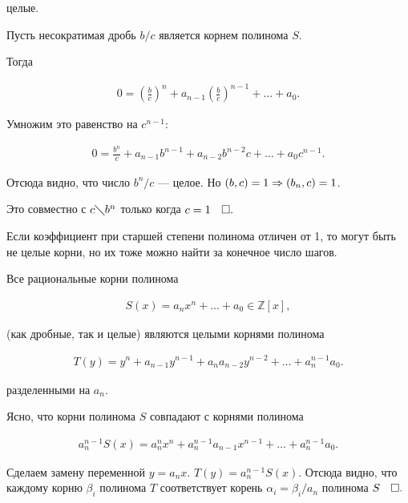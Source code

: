 \documentclass{article}
\begin{document}
целые.

\proof

Пусть несократимая дробь $b/c$ является корнем полинома $S$.

Тогда

\begin{align*}
	0=\left(\frac{b}{c}\right)^n+a_{n-1} \left(\frac{b}{c}\right)^{n-1}+\ldots +a_0.
\end{align*}

Умножим это равенство на $c^{n-1}$:

\begin{align*}
	0=\frac{b^n}{c}+a_{n-1} b^{n-1}+a_{n-2} b^{n-2} c+\ldots +a_0 c^{n-1}.
\end{align*}

Отсюда видно, что число $b^n/c$ --- целое. Но $(b, c) = 1 \Rarr (b_n, c) = 1$.

Это совместно с  $c\diagdown b^n$ только когда $c = 1~~\qed$ \newline

Если коэффициент при старшей степени полинома отличен от 1, то могут быть не целые корни, но их тоже можно найти за конечное число шагов. \newpage

\theorem[6.37.]

Все рациональные корни полинома

\begin{align*}
	S(x)=a_n x^n+\ldots +a_0\in\mathbb{Z} [x],
\end{align*}

(как дробные, так и целые) являются целыми корнями полинома

\begin{align*}
	T(y)=y^n+a_{n-1} y^{n-1}+a_n a_{n-2} y^{n-2}+\ldots +a^{n-1}_n a_0.
\end{align*}

разделенными на $a_n$.

\proof

Ясно, что корни полинома $S$ совпадают с корнями полинома

\begin{align*}
	a^{n-1}_n S(x)=a^n_n x^n+a^{n-1}_n a_{n-1} x^{n-1}+\ldots +a^{n-1}_n a_0.
\end{align*}

Сделаем замену переменной $y = a_n x$. $T(y)=a^{n-1}_n S(x)$.
Отсюда видно, что каждому корню $\beta_i$ полинома $T$ соответствует корень $\alpha_i=\beta_i/a_n$ полинома $S~~\qed$
\end{document}
